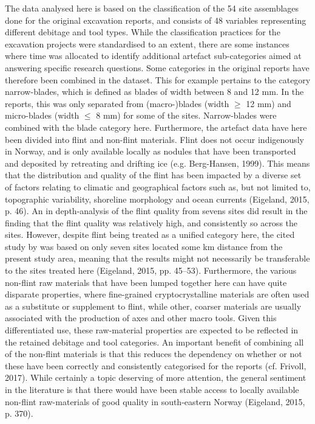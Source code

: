 \documentclass[
]{article}
\begin{document}
The data analysed here is based on the classification of the 54 site assemblages done for the original excavation reports, and consists of 48 variables representing different debitage and tool types. While the classification practices for the excavation projects were standardised to an extent, there are some instances where time was allocated to identify additional artefact sub-categories aimed at answering specific research questions. Some categories in the original reports have therefore been combined in the dataset. This for example pertains to the category narrow-blades, which is defined as blades of width between 8 and 12 mm. In the reports, this was only separated from (macro-)blades (width \(\ge\) 12 mm) and micro-blades (width \(\le\) 8 mm) for some of the sites. Narrow-blades were combined with the blade category here. Furthermore, the artefact data have here been divided into flint and non-flint materials. Flint does not occur indigenously in Norway, and is only available locally as nodules that have been transported and deposited by retreating and drifting ice (e.g. Berg-Hansen, 1999). This means that the distribution and quality of the flint has been impacted by a diverse set of factors relating to climatic and geographical factors such as, but not limited to, topographic variability, shoreline morphology and ocean currents (Eigeland, 2015, p. 46). An in depth-analysis of the flint quality from sevens sites did result in the finding that the flint quality was relatively high, and consistently so across the sites. However, despite flint being treated as a unified category here, the cited study by was based on only seven sites located some km distance from the present study area, meaning that the results might not necessarily be transferable to the sites treated here (Eigeland, 2015, pp. 45--53). Furthermore, the various non-flint raw materials that have been lumped together here can have quite disparate properties, where fine-grained cryptocrystalline materials are often used as a substitute or supplement to flint, while other, coarser materials are usually associated with the production of axes and other macro tools. Given this differentiated use, these raw-material properties are expected to be reflected in the retained debitage and tool categories. An important benefit of combining all of the non-flint materials is that this reduces the dependency on whether or not these have been correctly and consistently categorised for the reports (cf. Frivoll, 2017). While certainly a topic deserving of more attention, the general sentiment in the literature is that there would have been stable access to locally available non-flint raw-materials of good quality in south-eastern Norway (Eigeland, 2015, p. 370).
\end{document}

